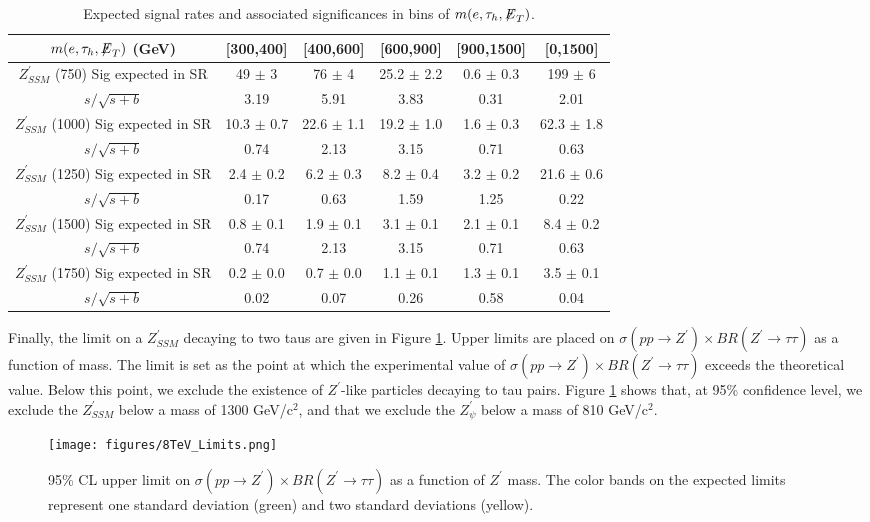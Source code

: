 \begin{table}[ht]
\begin{center}
  \caption{Expected signal rates and associated significances in bins of $m(e,\tau_{h},{\not\mathrel{E}}_T)$. }\label{tab:8TeV_SignalRates}
  \begin{tabular}{| c | c | c | c | c | c |}
  \hline
$m(e,\tau_{h},{\not\mathrel{E}}_T)$ (GeV) & [300,400] & [400,600] & [600,900] & [900,1500] & [0,1500]   \\ \hline
$Z^\prime_{SSM}$ (750) 
   Sig expected in SR  & 49 $\pm$ 3  & 76 $\pm$ 4  & 25.2 $\pm$ 2.2  & 0.6 $\pm$ 0.3 & 199 $\pm$ 6 \\
   $s/\sqrt{s+b}$ & 3.19  & 5.91 & 3.83 & 0.31 & 2.01   \\   \hline
$Z^\prime_{SSM}$ (1000)
   Sig expected in SR  & 10.3 $\pm$ 0.7  & 22.6 $\pm$ 1.1  & 19.2 $\pm$ 1.0  & 1.6 $\pm$ 0.3 & 62.3 $\pm$ 1.8 \\
   $s/\sqrt{s+b}$ & 0.74  & 2.13 & 3.15 & 0.71 & 0.63   \\   \hline
$Z^\prime_{SSM}$ (1250)
   Sig expected in SR  & 2.4 $\pm$ 0.2  & 6.2 $\pm$ 0.3  & 8.2 $\pm$ 0.4  & 3.2 $\pm$ 0.2 & 21.6 $\pm$ 0.6 \\
   $s/\sqrt{s+b}$ & 0.17  & 0.63 & 1.59 & 1.25 & 0.22   \\   \hline
  \hline
$Z^\prime_{SSM}$ (1500)
   Sig expected in SR  & 0.8 $\pm$ 0.1  & 1.9 $\pm$ 0.1  & 3.1 $\pm$ 0.1  & 2.1 $\pm$ 0.1 & 8.4 $\pm$ 0.2 \\
   $s/\sqrt{s+b}$ & 0.74  & 2.13 & 3.15 & 0.71 & 0.63   \\   \hline  
$Z^\prime_{SSM}$ (1750)
   Sig expected in SR  & 0.2 $\pm$ 0.0  & 0.7 $\pm$ 0.0  & 1.1 $\pm$ 0.1  & 1.3 $\pm$ 0.1 & 3.5 $\pm$ 0.1 \\
   $s/\sqrt{s+b}$ & 0.02  & 0.07 & 0.26 & 0.58 & 0.04   \\   \hline  
  \end{tabular}
\end{center}
\end{table}

Finally, the limit on a $Z^{\prime}_{SSM}$ decaying to two taus are given in Figure \ref{fig:8TeV_Limits}. Upper limits are placed on $\sigma\left(pp\to Z^{\prime}\right)\times BR\left(Z^{\prime}\to\tau\tau\right)$ as a function of mass. The limit is set as the point at which the experimental value of $\sigma\left(pp\to Z^{\prime}\right)\times BR\left(Z^{\prime}\to\tau\tau\right)$ exceeds the theoretical value. Below this point, we exclude the existence of $Z^{\prime}$-like particles decaying to tau pairs. Figure \ref{fig:8TeV_Limits} shows that, at 95\% confidence level, we exclude the $Z^{\prime}_{SSM}$ below a mass of 1300 GeV/c$^2$, and that we exclude the $Z^{\prime}_{\psi}$ below a mass of 810 GeV/c$^2$.

\begin{figure}[tbh!]
\centering
\texttt{[image: figures/8TeV\_Limits.png]}
\caption{95\% CL upper limit on $\sigma\left(pp\to Z^{\prime}\right)\times BR\left(Z^{\prime}\to\tau\tau\right)$ 
as a function of $Z^{\prime}$ mass. The color bands on the expected limits represent one standard deviation (green) and two standard deviations (yellow).}
\label{fig:8TeV_Limits}
\end{figure}
